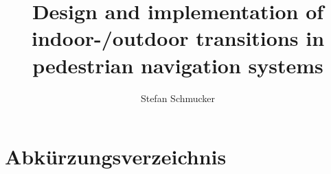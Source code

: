 




\author{Stefan Schmucker}
\title{Design and implementation of indoor-/outdoor transitions in pedestrian navigation systems}
\newcommand{\matrikel}{1749055}
\newcommand{\email}{stefan.schmucker@uni-bamberg.de}
\newcommand{\termin}{30.09.2019}
\newcommand{\studiengang}{Software Systems Science}
\newcommand{\arbeitstyp}{Bachelorarbeit}





\pagestyle{headings} %
\tableofcontents
\chapter*{Abkürzungsverzeichnis}

\vspace{9cm}

\listoffigures
\listoftables













%



